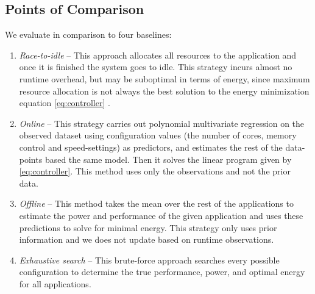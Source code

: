 \subsection{Points of Comparison}
\label{sec:poc}
We evaluate \SYSTEM{} in comparison to four baselines:
\begin{enumerate}
\item \textit{Race-to-idle} -- This approach allocates all resources
  to the application and once it is finished the system goes to idle.
  This strategy incurs almost no runtime overhead, but may be
  suboptimal in terms of energy, since maximum resource allocation is
  not always the best solution to the energy minimization equation
  \eqref{eq:controller}
  \cite{Carroll2013,HotPower,LeSueur11}.
\item \textit{Online} -- This strategy carries out polynomial
  multivariate regression on the observed dataset using configuration
  values (the number of cores, memory control and speed-settings) as
  predictors, and estimates the rest of the data-points based the same
  model. Then it solves the linear program given by
  \eqref{eq:controller}. This method uses only the observations and
  not the prior data.
\item \textit{Offline} -- This method takes the mean over the rest of
  the applications to estimate the power and performance of the given
  application and uses these predictions to solve for minimal energy.
  This strategy only uses prior information and we does not update
  based on runtime observations.
\item \textit{Exhaustive search} -- This brute-force approach searches
  every possible configuration to determine the true performance,
  power, and optimal energy for all applications.
\end{enumerate}


